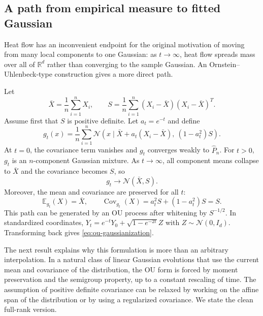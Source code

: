 \documentclass[preprint]{imsart}
\theoremstyle{plain}
\theoremstyle{definition}
\newcommand{\R}{\mathbb{R}}
\newcommand{\E}{\mathbb{E}}
\newcommand{\Cov}{\operatorname{Cov}}
\newcommand{\Normal}{\mathcal{N}}
\newcommand{\Emp}{\widehat P_n}
\begin{document}
\subsection{A path from empirical measure to fitted Gaussian}
\label{subsec:ou-path}

Heat flow has an inconvenient endpoint for the original motivation of moving from many local components to one Gaussian: as $t\to\infty$, heat flow spreads mass over all of $\R^d$ rather than converging to the sample Gaussian. An Ornstein--Uhlenbeck-type construction gives a more direct path.

Let
\[
  \bar X=\frac1n\sum_{i=1}^n X_i,
  \qquad
  S=\frac1n\sum_{i=1}^n (X_i-\bar X)(X_i-\bar X)^T.
\]
Assume first that $S$ is positive definite. Let $a_t=e^{-t}$ and define
\begin{equation}
  g_t(x)=\frac1n\sum_{i=1}^n
  \Normal\left(x\mid \bar X+a_t(X_i-\bar X),\ (1-a_t^2)S\right).
  \label{eq:ou-gaussianization}
\end{equation}
At $t=0$, the covariance term vanishes and $g_t$ converges weakly to $\Emp$. For $t>0$, $g_t$ is an $n$-component Gaussian mixture. As $t\to\infty$, all component means collapse to $\bar X$ and the covariance becomes $S$, so
\begin{equation*}
  g_t \to \Normal(\bar X,S).
\end{equation*}
Moreover, the mean and covariance are preserved for all $t$:
\[
  \E_{g_t}(X)=\bar X,
  \qquad
  \Cov_{g_t}(X)=a_t^2S+(1-a_t^2)S=S.
\]
This path can be generated by an OU process after whitening by $S^{-1/2}$. In standardized coordinates, $Y_t=e^{-t}Y_0+\sqrt{1-e^{-2t}}Z$ with $Z\sim\Normal(0,I_d)$. Transforming back gives \eqref{eq:ou-gaussianization}.

The next result explains why this formulation is more than an arbitrary interpolation. In a natural class of linear Gaussian evolutions that use the current mean and covariance of the distribution, the OU form is forced by moment preservation and the semigroup property, up to a constant rescaling of time. The assumption of positive definite covariance can be relaxed by working on the affine span of the distribution or by using a regularized covariance. We state the clean full-rank version. 
\end{document}
